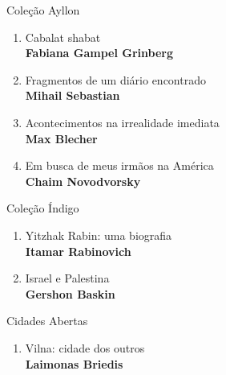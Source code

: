 \pagebreak
\pagestyle{empty}

\begingroup
\fontsize{7}{8}%

\scriptsize
{\formular\large{Coleção Ayllon}}
\begin{enumerate}
\setlength\parskip{4.2pt}
\setlength\itemsep{-1.4mm}
\item Cabalat shabat\\ \textbf{Fabiana Gampel Grinberg}
\setlength\parskip{8pt}
\item Fragmentos de um diário encontrado\\ \textbf{Mihail Sebastian}
\item Acontecimentos na irrealidade imediata\\ \textbf{Max Blecher}
\item Em busca de meus irmãos na América\\ \textbf{Chaim Novodvorsky}
\end{enumerate}

\scriptsize
{\formular\large{Coleção Índigo}}
\begin{enumerate}
\setlength\parskip{4.2pt}
\setlength\itemsep{-1.4mm}
\item Yitzhak Rabin: uma biografia\\ \textbf{Itamar Rabinovich}
\setlength\parskip{8pt}
\item Israel e Palestina\\ \textbf{Gershon Baskin}
\end{enumerate}

\scriptsize
{\formular\large{Cidades Abertas}}
\begin{enumerate}
\setlength\parskip{4.2pt}
\setlength\itemsep{-1.4mm}
\item Vilna: cidade dos outros\\ \textbf{Laimonas Briedis}
\end{enumerate}

\pagebreak